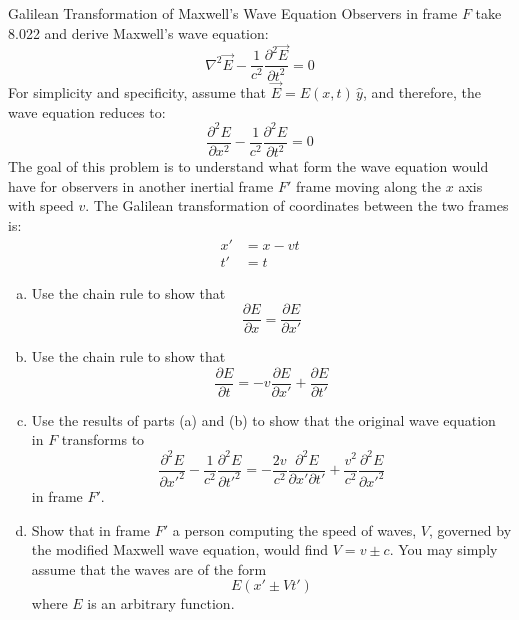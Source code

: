 \documentclass[makesolutionspdf]{esg8022pset}
\begin{document}
\begin{problem}{Galilean Transformation of Maxwell's Wave Equation}
  Observers in frame $F$ take 8.022 and derive Maxwell's wave equation:
  $$\nabla^2\vec{E} - \frac{1}{c^2} \frac{\partial^2\vec{E}}{\partial t^2} = 0$$
  For simplicity and specificity, assume that $\vec{E} = E(x,t)\, \hat{y}$, and therefore, the wave equation reduces to:
  $$\frac{\partial^2E}{\partial x^2} - \frac{1}{c^2} \frac{\partial^2E}{\partial t^2} = 0$$
  The goal of this problem is to understand what form the wave equation would have for observers in another inertial frame $F'$ frame moving along the $x$ axis with speed $v$.  The Galilean transformation of coordinates between the two frames is:
  \begin{align*}
    x' & = x - vt \\
    t' & = t
  \end{align*}
  
  \begin{enumerate}[(a)]
    \item Use the chain rule to show that
      $$\frac{\partial E}{\partial x} = \frac{\partial E}{\partial x'}$$
    \item Use the chain rule to show that
      $$\frac{\partial E}{\partial t} = -v \frac{\partial E}{\partial x'} + \frac{\partial E}{\partial t'}$$
    \item Use the results of parts (a) and (b) to show that the original wave equation in $F$ transforms to
      $$\frac{\partial^2E}{\partial x'^2} - \frac{1}{c^2} \frac{\partial^2E}{\partial t'^2} = -\frac{2v}{c^2} \frac{\partial^2E}{\partial x' \partial t'} + \frac{v^2}{c^2} \frac{\partial^2E}{\partial x'^2}$$
      in frame $F'$.
    \item Show that in frame $F'$ a person computing the speed of waves, $V$, governed by the modified Maxwell wave equation, would find $V = v \pm c$.  You may simply assume that the waves are of the form
      $$E(x' \pm Vt')$$
      where $E$ is an arbitrary function.
  \end{enumerate}
\end{problem}
\end{document}
